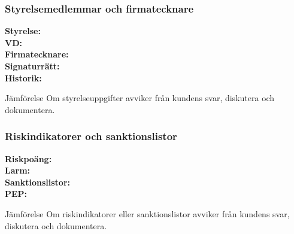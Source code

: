 \documentclass[10pt]{beamer}
\begin{document}
\begin{frame}[label=styrelse]
  \frametitle{Styrelsemedlemmar och firmatecknare}
  \small
  \textbf{Styrelse:} \underline{\hspace{8cm}} \\
  \textbf{VD:} \underline{\hspace{8cm}} \\
  \textbf{Firmatecknare:} \underline{\hspace{8cm}} \\
  \textbf{Signaturrätt:} \underline{\hspace{8cm}} \\
  \textbf{Historik:} \underline{\hspace{8cm}} \\
  \vspace{0.5cm}
  \begin{block}{Jämförelse}
    Om styrelseuppgifter avviker från kundens svar, diskutera och dokumentera.
  \end{block}
  \vspace{0.8cm}
  \begin{flushright}
    \hyperlink{nextslide}{}
  \end{flushright}
\end{frame}

\begin{frame}[label=riskindikator]
  \frametitle{Riskindikatorer och sanktionslistor}
  \small
  \textbf{Riskpoäng:} \underline{\hspace{8cm}} \\
  \textbf{Larm:} \underline{\hspace{8cm}} \\
  \textbf{Sanktionslistor:} \underline{\hspace{8cm}} \\
  \textbf{PEP:} \underline{\hspace{8cm}} \\
  \vspace{0.5cm}
  \begin{block}{Jämförelse}
    Om riskindikatorer eller sanktionslistor avviker från kundens svar, diskutera och dokumentera.
  \end{block}
  \vspace{0.8cm}
  \begin{flushright}
    \hyperlink{nextslide}{}
  \end{flushright}
\end{frame}
\end{document}

